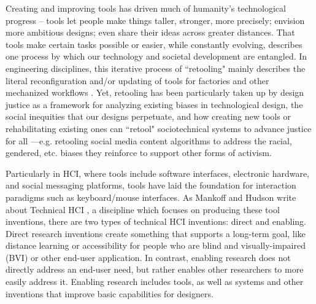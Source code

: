 Creating and improving tools has driven much of humanity's technological progress -- tools let people make things taller, stronger, more precisely; envision more ambitious designs; even share their ideas across greater distances. That tools make certain tasks possible or easier, while constantly evolving, describes one process by which our technology and societal development are entangled. In engineering disciplines, this iterative process of ``retooling" mainly describes the literal reconfiguration and/or updating of tools for factories and other mechanized workflows \todo{[152]}. Yet, retooling has been particularly taken up by design justice as a framework for analyzing existing biases in technological design, the social inequities that our designs perpetuate, and how creating new tools or rehabilitating existing ones can ``retool" sociotechnical systems to advance justice for all \todo{[33]}---e.g. retooling social media content algorithms to address the racial, gendered, etc. biases they reinforce to support other forms of activism. 

Particularly in HCI, where tools include software interfaces, electronic hardware, and social messaging platforms, tools have laid the foundation for interaction paradigms such as keyboard/mouse interfaces. As Mankoff and Hudson write about Technical HCI , a discipline which focuses on producing these tool inventions, there are two types of technical HCI inventions: direct and enabling. Direct research inventions create something that supports a long-term goal, like distance learning or accessibility for people who are blind and visually-impaired (BVI) or other end-user application. In contrast, enabling research does not directly address an end-user need, but rather enables other researchers to more easily address it. Enabling research includes tools, as well as systems and other inventions that improve basic capabilities for designers.

